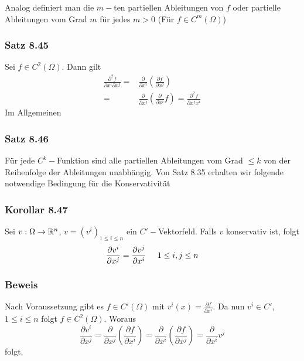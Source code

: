 Analog definiert man die $m-$ten partiellen Ableitungen von $f$ oder partielle Ableitungen vom Grad $m$ für jedes $m>0$ (Für $f\in C^m \left(\Omega\right)$)

\subsubsection*{Satz 8.45}
Sei $f\in C^2\left(\Omega\right)$. Dann gilt
\begin{align*}
\frac{{{\partial ^2}f}}{{\partial {x^i}\partial {x^j}}} = &\frac{\partial }{{\partial {x^i}}}\left( {\frac{{\partial f}}{{\partial {x^j}}}} \right)\\
 = &\frac{\partial }{{\partial {x^j}}}\left( {\frac{\partial }{{\partial {x^i}}}f} \right) = \frac{{{\partial ^2}f}}{{\partial {x^j}{x^i}}}
\end{align*}
Im Allgemeinen
\subsubsection*{Satz 8.46}
Für jede $C^k-$Funktion sind alle partiellen Ableitungen vom Grad $\leq k$ von der Reihenfolge der Ableitungen unabhängig. Von Satz 8.35 erhalten wir folgende notwendige Bedingung für die Konservativität

\subsubsection*{Korollar 8.47}
Sei $v:\Omega\to\mathbb{R}^n$, $v={\left( v^i\right)}_{1\leq i \leq n}$ ein $C'-$Vektorfeld. Falls $v$ konservativ ist, folgt
\[\frac{{\partial {v^i}}}{{\partial {x^j}}} = \frac{{\partial {v^j}}}{{\partial {x^i}}}\hspace{5mm}1 \le i,j \le n\]

\subsubsection*{Beweis}
Nach Voraussetzung gibt es $f\in C'\left( \Omega\right)$ mit $v^i(x)=\frac{\partial f}{\partial x^i}$. Da nun $v^i \in C'$, $1\leq i\leq n$ folgt $f\in C^2\left( \Omega\right)$. Woraus
\[\frac{{\partial {v^i}}}{{\partial {x^j}}} = \frac{\partial }{{\partial {x^j}}}\left( {\frac{{\partial f}}{{\partial {x^i}}}} \right) = \frac{\partial }{{\partial {x^i}}}\left( {\frac{{\partial f}}{{\partial {x^j}}}} \right) = \frac{\partial }{{\partial {x^i}}}{v^j}\]
folgt.

